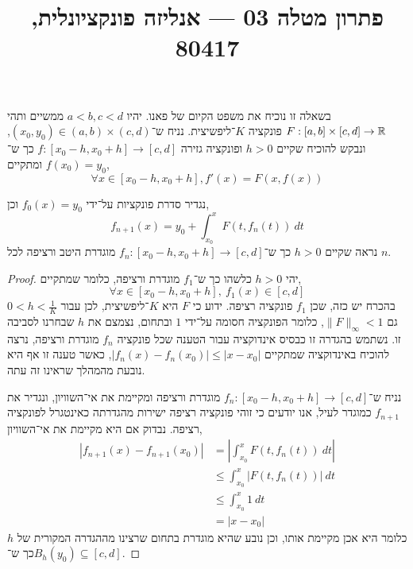 
\title{פתרון מטלה 03 --- אנליזה פונקציונלית, 80417}


\maketitle
\maketitleprint{}

\question{}
בשאלה זו נוכיח את משפט הקיום של פאנו.
יהיו $a < b, c < d$ ממשיים ותהי $F : [a, b] \times [c, d] \to \mathbb{R}$ פונקציה $K$־ליפשיצית.
נניח ש־$(x_{0}, y_{0}) \in (a, b) \times (c, d)$, ונבקש להוכיח שקיים $h > 0$ ופונקציה גזירה $f : [x_0 - h, x_0 + h] \to [c, d]$ כך ש־$f(x_0) = y_0$ ומתקיים,
\[
	\forall x \in [x_0 - h, x_0 + h], f'(x) = F(x, f(x))
\]

\subquestion{}
נגדיר סדרת פונקציות על־ידי $f_0(x) = y_0$ וכן,
\[
	f_{n + 1}(x) = y_0 + \int_{x_0}^{x} F(t, f_n(t))\ dt
\]
נראה שקיים $h > 0$ כך ש־$f_n : [x_0 - h, x_0 + h] \to [c, d]$ מוגדרת היטב ורציפה לכל $n$.
\begin{proof}
	יהי $h > 0$ כלשהו כך ש־$f_1$ מוגדרת ורציפה, כלומר שמתקיים,
	\[
		\forall x \in [x_0 - h, x_0 + h],\ 
		f_1(x) \in [c, d]
	\]
	בהכרח יש כזה, שכן $f_1$ פונקציה רציפה.
	ידוע כי $F$ היא $K$־ליפשיצית, לכן עבור $0 < h < \frac{1}{K}$ גם $\lVert F \rVert_\infty < 1$, כלומר הפונקציה חסומה על־ידי $1$ ובתחום, נצמצם את $h$ שבחרנו לסביבה זו.
	נשתמש בהגדרה זו כבסיס אינדוקציה עבור הטענה שכל פונקציה $f_n$ מוגדרת ורציפה, נרצה להוכיח באינדוקציה שמתקיים $|f_n(x) - f_n(x_0)| \le |x - x_0|$, כאשר טענה זו אף היא נובעת מהמהלך שראינו זה עתה.

	נניח ש־$f_n : [x_0 - h, x_0 + h] \to [c, d]$ מוגדרת ורציפה ומקיימת את אי־השוויון,
	ונגדיר את $f_{n + 1}$ כמוגדר לעיל, אנו יודעים כי זוהי פונקציה רציפה ישירות מהגדרתה כאינטגרל לפונקציה רציפה.
	נבדוק אם היא מקיימת את אי־השוויון,
	\begin{align*}
		|f_{n + 1}(x) - f_{n + 1}(x_0)|
		& = \left\lvert \int_{x_0}^{x} F(t, f_n(t))\ dt \right\rvert \\
		& \le \int_{x_0}^{x} |F(t, f_n(t))|\ dt  \\
		& \le \int_{x_0}^{x} 1\ dt \\
		& = |x - x_0|
	\end{align*}
	כלומר היא אכן מקיימת אותו, וכן נובע שהיא מוגדרת בתחום שרצינו מההגדרה המקורית של $h$ כך ש־$B_h(y_0) \subseteq [c, d]$.
\end{proof}

